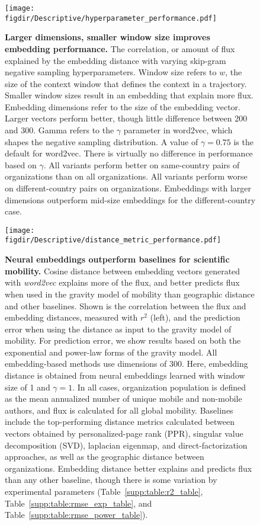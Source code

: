 \documentclass[12pt]{article} %
\def\figdir{../Figs}
\begin{document}
%
%
\begin{figure}[p!]
	\centering
	\texttt{[image: \\figdir/Descriptive/hyperparameter\_performance.pdf]}
	\caption{
		\textbf{Larger dimensions, smaller window size improves embedding performance.}
		The correlation, or amount of flux explained by the embedding distance with varying skip-gram negative sampling hyperparameters.
		Window size refers to $w$, the size of the context window that defines the context in a trajectory.
		Smaller window sizes result in an embedding that explain more flux.
		Embedding dimensions refer to the size of the embedding vector.
		Larger vectors perform better, though little difference between 200 and 300.
		Gamma refers to the $\gamma$ parameter in word2vec, which shapes the negative sampling distribution. 
		A value of $\gamma = 0.75$ is the default for word2vec.
		There is virtually no difference in performance based on $\gamma$.
		All variants perform better on same-country pairs of organizations than on all organizations.
		All variants perform worse on different-country pairs on organizations.
		Embeddings with larger dimensions outperform mid-size embeddings for the different-country case.
	}

	\label{fig:supp:hyperparameter}
\end{figure}


%
%
\begin{figure}[ht!]
	\centering
	\texttt{[image: \\figdir/Descriptive/distance\_metric\_performance.pdf]}
	\caption{ 
	\textbf{Neural embeddings outperform baselines for scientific mobility.}
		Cosine distance between embedding vectors generated with \textit{word2vec} explains more of the flux, and better predicts flux when used in the gravity model of mobility than geographic distance and other baselines. 
		Shown is the correlation between the flux and embedding distances, measured with $r^{2}$ (left), and the prediction error when using the distance as input to the gravity model of mobility. 
		For prediction error, we show results based on both the exponential and power-law forms of the gravity model. 
		All embedding-based methods use dimensions of 300. 
		Here, embedding distance is obtained from neural embeddings learned with window size of 1 and $\gamma = 1$.  
		In all cases, organization population is defined as the mean annualized number of unique mobile and non-mobile authors, and flux is calculated for all global mobility. 
		Baselines include the top-performing distance metrics calculated between vectors obtained by personalized-page rank (PPR), singular value decomposition (SVD), laplacian eigenmap, and direct-factorization~\autocite{levy2014neural} approaches, as well as the geographic distance between organizations. 
		Embedding distance better explains and predicts flux than any other baseline, though there is some variation by experimental parameters (Table~\ref{supp:table:r2_table}, Table~\ref{supp:table:rmse_exp_table}, and Table~\ref{supp:table:rmse_power_table}).
	}
	\label{fig:supp:distancemetrics}
\end{figure}
\end{document}

